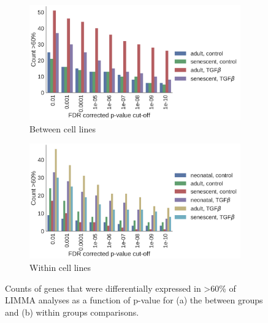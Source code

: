 \documentclass[alpha-refs]{wiley-article}
\begin{document}
\begin{figure}
	\begin{subfigure}{0.45\linewidth}
		\includegraphics[width=\linewidth]{LIMMA09_2018/SavedObjects/between_pvalue_counts}
		\caption{Between cell lines}
		\label{fig:pvalues:between}
	\end{subfigure}
	\begin{subfigure}{0.45\linewidth}
		\includegraphics[width=\linewidth]{LIMMA09_2018/SavedObjects/within_pvalue_counts}
		\caption{Within cell lines}
		\label{fig:pvalues:within}
	\end{subfigure}
	\caption{Counts of genes that were differentially expressed in >60\% of LIMMA analyses as a function of p-value for (a) the between groups and (b) within groups comparisons.}
	\label{fig:pvalues}
\end{figure}
\end{document}
